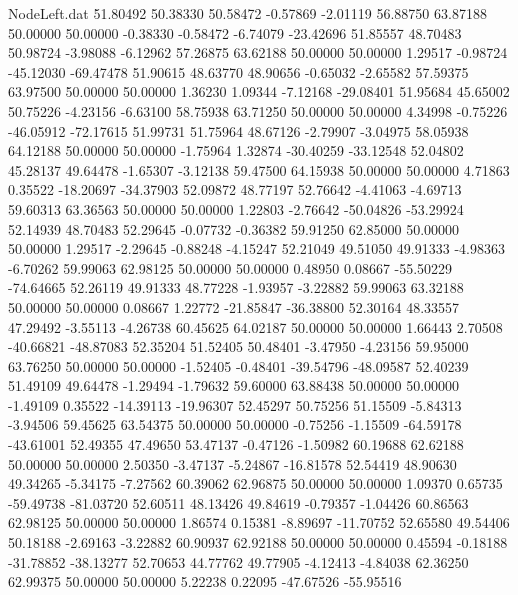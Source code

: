 \begin{filecontents}{NodeLeft.dat}
  51.80492   50.38330   50.58472    -0.57869   -2.01119   56.88750   63.87188   50.00000   50.00000   -0.38330   -0.58472   -6.74079  -23.42696
  51.85557   48.70483   50.98724    -3.98088   -6.12962   57.26875   63.62188   50.00000   50.00000    1.29517   -0.98724  -45.12030  -69.47478
  51.90615   48.63770   48.90656    -0.65032   -2.65582   57.59375   63.97500   50.00000   50.00000    1.36230    1.09344   -7.12168  -29.08401
  51.95684   45.65002   50.75226    -4.23156   -6.63100   58.75938   63.71250   50.00000   50.00000    4.34998   -0.75226  -46.05912  -72.17615
  51.99731   51.75964   48.67126    -2.79907   -3.04975   58.05938   64.12188   50.00000   50.00000   -1.75964    1.32874  -30.40259  -33.12548
  52.04802   45.28137   49.64478    -1.65307   -3.12138   59.47500   64.15938   50.00000   50.00000    4.71863    0.35522  -18.20697  -34.37903
  52.09872   48.77197   52.76642    -4.41063   -4.69713   59.60313   63.36563   50.00000   50.00000    1.22803   -2.76642  -50.04826  -53.29924
  52.14939   48.70483   52.29645    -0.07732   -0.36382   59.91250   62.85000   50.00000   50.00000    1.29517   -2.29645   -0.88248   -4.15247
  52.21049   49.51050   49.91333    -4.98363   -6.70262   59.99063   62.98125   50.00000   50.00000    0.48950    0.08667  -55.50229  -74.64665
  52.26119   49.91333   48.77228    -1.93957   -3.22882   59.99063   63.32188   50.00000   50.00000    0.08667    1.22772  -21.85847  -36.38800
  52.30164   48.33557   47.29492    -3.55113   -4.26738   60.45625   64.02187   50.00000   50.00000    1.66443    2.70508  -40.66821  -48.87083
  52.35204   51.52405   50.48401    -3.47950   -4.23156   59.95000   63.76250   50.00000   50.00000   -1.52405   -0.48401  -39.54796  -48.09587
  52.40239   51.49109   49.64478    -1.29494   -1.79632   59.60000   63.88438   50.00000   50.00000   -1.49109    0.35522  -14.39113  -19.96307
  52.45297   50.75256   51.15509    -5.84313   -3.94506   59.45625   63.54375   50.00000   50.00000   -0.75256   -1.15509  -64.59178  -43.61001
  52.49355   47.49650   53.47137    -0.47126   -1.50982   60.19688   62.62188   50.00000   50.00000    2.50350   -3.47137   -5.24867  -16.81578
  52.54419   48.90630   49.34265    -5.34175   -7.27562   60.39062   62.96875   50.00000   50.00000    1.09370    0.65735  -59.49738  -81.03720
  52.60511   48.13426   49.84619    -0.79357   -1.04426   60.86563   62.98125   50.00000   50.00000    1.86574    0.15381   -8.89697  -11.70752
  52.65580   49.54406   50.18188    -2.69163   -3.22882   60.90937   62.92188   50.00000   50.00000    0.45594   -0.18188  -31.78852  -38.13277
  52.70653   44.77762   49.77905    -4.12413   -4.84038   62.36250   62.99375   50.00000   50.00000    5.22238    0.22095  -47.67526  -55.95516

\end{filecontents}
